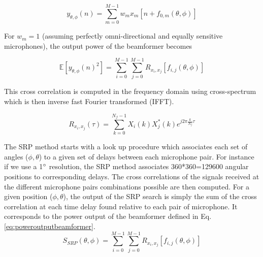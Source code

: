 \begin{equation}
    y_{\theta,\phi}(n)=\sum\limits_{m=0}^{M-1}{w_m x_m[n + f_{0,m}(\theta,\phi)]} 
\end{equation}


For $w_m=1$ (assuming perfectly omni-directional and equally sensitive microphones), the output power of the beamformer becomes

\begin{equation}
    \mathbb{E}[{y_{\theta,\phi}(n)^2}]=\sum\limits_{i=0}^{M-1}\sum\limits_{j=0}^{M-1}{R_{x_i,x_j}[f_{i,j}(\theta,\phi)]} 
    \label{eq:poweroutputbeamformer}
\end{equation}

This cross correlation is computed in the frequency domain using cross-spectrum which is then inverse fast Fourier transformed (IFFT).

\begin{equation}
    R_{x_i,x_j}(\tau)= \sum\limits_{k=0}^{N_{f}-1}{X_{i}(k)X_{j}^*(k)e^{j2\pi\frac{k}{N_{f}}\tau}}
\end{equation}


The SRP method starts with a look up procedure which associates each set of angles ($\phi,\theta$) to a given set of delays between each microphone pair. For instance if we use a 1$\degree$  resolution, the SRP method associates 360*360=129600 angular positions to corresponding delays. The cross correlations of the signals received at the different microphone pairs combinations possible are then computed. For a given position ($\phi,\theta$), the output of the SRP search is simply the sum of the cross correlation at each time delay found relative to each pair of microphone. It corresponds to the power output of the beamformer defined in Eq. \ref{eq:poweroutputbeamformer}. 
\begin{equation}
    S_{SRP}(\theta,\phi)=\sum\limits_{i=0}^{M-1}\sum\limits_{j=0}^{M-1}{R_{x_i,x_j}[f_{i,j}(\theta,\phi)]}
\end{equation}

